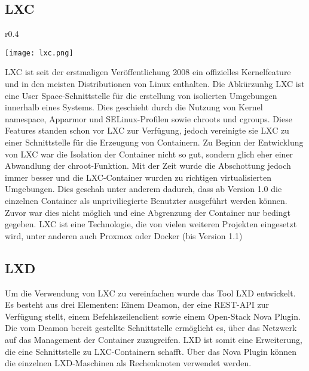\subsection{LXC}
\label{sec:lxc}
\begin{wrapfigure}{r}{0.4\textwidth}
	\vspace{-40pt}
	\begin{center}
		\texttt{[image: lxc.png]}
	\end{center}
	\vspace{-15pt}
	\caption[Logo LXC]{ \footnotemark}
	\label{fig:lxc}
	\vspace{-30pt}
\end{wrapfigure}
LXC ist seit der erstmaligen Veröffentlichung 2008 ein offizielles Kernelfeature und in den meisten Distributionen von Linux enthalten. Die Abkürzunhg LXC ist eine User Space-Schnittstelle für die erstellung von isolierten Umgebungen innerhalb eines Systems. Dies geschieht durch die Nutzung von Kernel namespace, Apparmor und SELinux-Profilen sowie chroots und cgroups. Diese Features standen schon vor LXC zur Verfügung, jedoch vereinigte sie LXC zu einer Schnittstelle für die Erzeugung von Containern. Zu Beginn der Entwicklung von LXC war die Isolation der Container nicht so gut, sondern glich eher einer Abwandlung der chroot-Funktion. Mit der Zeit wurde die Abschottung jedoch immer besser und die LXC-Container wurden zu richtigen virtualisierten Umgebungen. Dies geschah unter anderem dadurch, dass ab Version 1.0 die einzelnen Container als unpriviliegierte Benutzter ausgeführt werden können. Zuvor war dies nicht möglich und eine Abgrenzung der Container nur bedingt gegeben. LXC ist eine Technologie, die von vielen weiteren Projekten eingesetzt wird, unter anderen auch Proxmox oder Docker (bis Version 1.1)\cite{LXCHomepage,IEEE7036275, IEEE7185212, IEEE7571957,IEEE7929714}


\subsection{LXD}
\label{sec:lxd}

Um die Verwendung von LXC zu vereinfachen wurde das Tool LXD entwickelt. Es besteht aus drei Elementen: Einem Deamon, der eine REST-API zur Verfügung stellt, einem Befehlszeilenclient sowie einem Open-Stack Nova Plugin. Die vom Deamon bereit gestellte Schnittstelle ermöglicht es, über das Netzwerk auf das Management der Container zuzugreifen. LXD ist somit eine Erweiterung, die eine Schnittstelle zu LXC-Containern schafft. Über das Nova Plugin können die einzelnen LXD-Maschinen als Rechenknoten verwendet werden. \cite{LXDHomepage}

